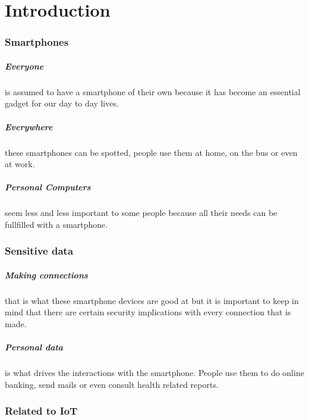 \documentclass{report}
\begin{document}
\chapter{Introduction}

\subsection*{Smartphones}

\paragraph*{Everyone} 
is assumed to have a smartphone of their own because it has become an essential gadget for our day to day lives.

\paragraph*{Everywhere}
these smartphones can be spotted, people use them at home, on the bus or even at work.

\paragraph*{Personal Computers}
seem less and less important to some people because all their needs can be fullfilled with a smartphone. 

\subsection*{Sensitive data}

\paragraph*{Making connections}
that is what these smartphone devices are good at but it is important to keep in mind that there are certain security implications with every connection that is made.

\paragraph*{Personal data}
is what drives the interactions with the smartphone. People use them to do online banking, send mails or even consult health related reports.

\subsection*{Related to IoT}
\end{document}
